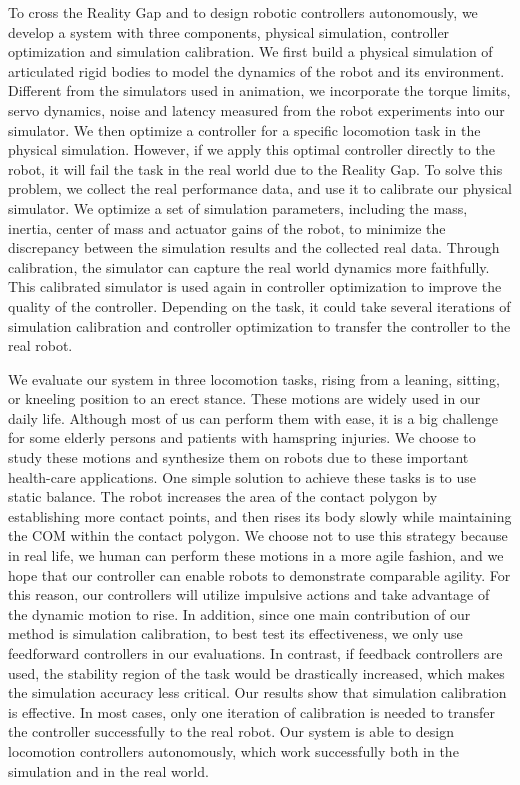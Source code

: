To cross the Reality Gap and to design robotic controllers autonomously, we develop a system with three components, physical simulation, controller optimization and simulation calibration. We first build a physical simulation of articulated rigid bodies to model the dynamics of the robot and its environment. Different from the simulators used in animation, we incorporate the torque limits, servo dynamics, noise and latency measured from the robot experiments into our simulator. We then optimize a controller for a specific locomotion task in the physical simulation. However, if we apply this optimal controller directly to the robot, it will fail the task in the real world due to the Reality Gap. To solve this problem, we collect the real performance data, and use it to calibrate our physical simulator. We optimize a set of simulation parameters, including the mass, inertia, center of mass and actuator gains of the robot, to minimize the discrepancy between the simulation results and the collected real data. Through calibration, the simulator can capture the real world dynamics more faithfully. This calibrated simulator is used again in controller optimization to improve the quality of the controller. Depending on the task, it could take several iterations of simulation calibration and controller optimization to transfer the controller to the real robot. 

We evaluate our system in three locomotion tasks, rising from a leaning, sitting, or kneeling position to an erect stance. These motions are widely used in our daily life. Although most of us can perform them with ease, it is a big challenge for some elderly persons and patients with hamspring injuries. We choose to study these motions and synthesize them on robots due to these important health-care applications. One simple solution to achieve these tasks is to use static balance. The robot increases the area of the contact polygon by establishing more contact points, and then rises its body slowly while maintaining the COM within the contact polygon. We choose not to use this strategy because in real life, we human can perform these motions in a more agile fashion, and we hope that our controller can enable robots to demonstrate comparable agility. For this reason, our controllers will utilize impulsive actions and take advantage of the dynamic motion to rise. In addition, since one main contribution of our method is simulation calibration, to best test its effectiveness, we only use feedforward controllers in our evaluations. In contrast, if feedback controllers are used, the stability region of the task would be drastically increased, which makes the simulation accuracy less critical. Our results show that simulation calibration is effective. In most cases, only one iteration of calibration is needed to transfer the controller successfully to the real robot. Our system is able to design locomotion controllers autonomously, which work successfully both in the simulation and in the real world. 

